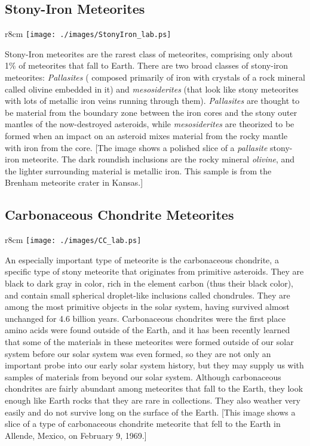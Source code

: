 \vfill

\subsection*{Stony-Iron Meteorites}

\begin{wrapfigure}{r}{8cm}
\texttt{[image: ./images/StonyIron\_lab.ps]}
\end{wrapfigure}

Stony-Iron meteorites are the rarest class of meteorites, comprising
only about 1\% of meteorites that fall to Earth.  There are two broad
classes of stony-iron meteorites: {\it Pallasites} ( composed
primarily of iron with crystals of a rock mineral called olivine
embedded in it) and {\it mesosiderites} (that look like stony
meteorites with lots of metallic iron veins running through them).
{\it Pallasites} are thought to be material from the boundary zone
between the iron cores and the stony outer mantles of the
now-destroyed asteroids, while {\it mesosiderites} are theorized to be
formed when an impact on an asteroid mixes material from the rocky
mantle with iron from the core.  [The image shows a polished slice of
a {\it pallasite} stony-iron meteorite.  The dark roundish inclusions
are the rocky mineral {\it olivine}, and the lighter surrounding
material is metallic iron.  This sample is from the Brenham meteorite
crater in Kansas.]

\vfill

\clearpage

\subsection*{Carbonaceous Chondrite Meteorites}


\begin{wrapfigure}{r}{8cm}
\texttt{[image: ./images/CC\_lab.ps]}
\end{wrapfigure}
%
An especially important type of meteorite is the carbonaceous
chondrite, a specific type of stony meteorite that originates from
primitive asteroids.  They are black to dark gray in color, rich in
the element carbon (thus their black color), and contain small
spherical droplet-like inclusions called chondrules.  They are among
the most primitive objects in the solar system, having survived almost
unchanged for 4.6 billion years.  Carbonaceous chondrites were the
first place amino acids were found outside of the Earth, and it has
been recently learned that some of the materials in these meteorites
were formed outside of our solar system before our solar system was
even formed, so they are not only an important probe into our early
solar system history, but they may supply us with samples of materials
from beyond our solar system.  Although carbonaceous chondrites are
fairly abundant among meteorites that fall to the Earth, they look
enough like Earth rocks that they are rare in collections.  They also
weather very easily and do not survive long on the surface of the
Earth.  [This image shows a slice of a type of carbonaceous chondrite
meteorite that fell to the Earth in Allende, Mexico, on February 9,
1969.]

